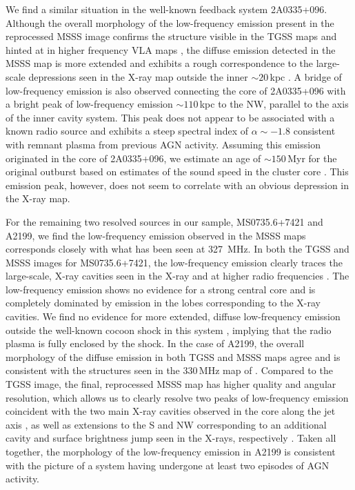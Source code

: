 \documentclass{aa}  %
\begin{document}
We find a similar situation in the well-known feedback system 2A0335+096. Although the overall morphology of the low-frequency emission present in the reprocessed MSSS image confirms the structure visible in the TGSS maps and hinted at in higher frequency VLA maps \citep{Birzan2008}, the diffuse emission detected in the MSSS map is more extended and exhibits a rough correspondence to the large-scale depressions seen in the X-ray map outside the inner $\sim20$\,kpc \citep{Sanders2009}. A bridge of low-frequency emission is also observed connecting the core of 2A0335+096 with a bright peak of low-frequency emission $\sim110$\,kpc to the NW, parallel to the axis of the inner cavity system. This peak does not appear to be associated with a known radio source and exhibits a steep spectral index of $\alpha \sim -1.8$ consistent with remnant plasma from previous AGN activity. Assuming this emission originated in the core of 2A0335+096, we estimate an age of $\sim150$\,Myr for the original outburst based on estimates of the sound speed in the cluster core \citep{Birzan2004}. This emission peak, however, does not seem to correlate with an obvious depression in the X-ray map.

For the remaining two resolved sources in our sample, MS0735.6+7421 and A2199, we find the low-frequency emission observed in the MSSS maps corresponds closely with what has been seen at 327~MHz. 
In both the TGSS and MSSS images for MS0735.6+7421, the low-frequency emission clearly traces the large-scale, X-ray cavities seen in the X-ray and at higher radio frequencies \citep{McNamara2005}. The low-frequency emission shows no evidence for a strong central core and is completely dominated by emission in the lobes corresponding to the X-ray cavities. We find no evidence for more extended, diffuse low-frequency emission outside the well-known cocoon shock in this system \citep{McNamara2009, Vantyghem2014}, implying that the radio plasma is fully enclosed by the shock. In the case of A2199, the overall morphology of the diffuse emission in both TGSS and MSSS maps agree and is consistent with the structures seen in the 330\,MHz map of \cite{Birzan2008}. Compared to the TGSS image, the final, reprocessed MSSS map has higher quality and angular resolution, which allows us to clearly resolve two peaks of low-frequency emission coincident with the two main X-ray cavities observed in the core along the jet axis \citep{Nulsen2013}, as well as extensions to the S and NW corresponding to an additional cavity and surface brightness jump seen in the X-rays, respectively \citep{Gentile2007, Nulsen2013}. Taken all together, the morphology of the low-frequency emission in A2199 is consistent with the picture of a system having undergone at least two episodes of AGN activity.
\end{document}
